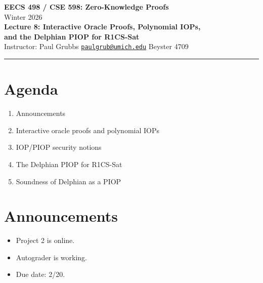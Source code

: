 \documentclass[11pt]{article}
\begin{document}
\begin{center}
  {\LARGE \textbf{EECS 498 / CSE 598: Zero-Knowledge Proofs}}\\[6pt]
  {\large Winter 2026}\\[4pt]
  {\large \textbf{Lecture 8: Interactive Oracle Proofs, Polynomial IOPs,}}\\
  {\large \textbf{and the Delphian PIOP for R1CS-Sat}}\\[6pt]
  Instructor: Paul Grubbs \quad
  \href{mailto:paulgrub@umich.edu}{\texttt{paulgrub@umich.edu}} \quad
  Beyster 4709
\end{center}

\hrule
\vspace{10pt}

\section*{Agenda}
\begin{enumerate}[leftmargin=2em]
  \item Announcements
  \item Interactive oracle proofs and polynomial IOPs
  \item IOP/PIOP security notions
  \item The Delphian PIOP for R1CS-Sat
  \item Soundness of Delphian as a PIOP
\end{enumerate}

\newpage

\section{Announcements}

\begin{itemize}
  \item Project 2 is online.
  \item Autograder is working.
  \item Due date: 2/20.
\end{itemize}

\end{document}
